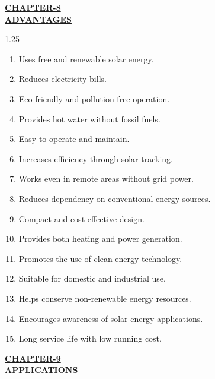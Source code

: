 \documentclass[12pt,a4paper]{article}
\begin{document}

\begin{center}
  {\fontsize{15}{18}\selectfont \bfseries \textcolor{red!80!black}{\underline{CHAPTER-8}}}\\[2mm]
  {\fontsize{16}{20}\selectfont \bfseries \textcolor{red!80!black}{\underline{ADVANTAGES}}}\\[6mm]
\end{center}

\begin{spacing}{1.25}
{\fontsize{10.5}{14.5}\selectfont
\begin{enumerate}[leftmargin=8mm, itemsep=2.2mm]
  \item Uses free and renewable solar energy.
  \item Reduces electricity bills.
  \item Eco-friendly and pollution-free operation.
  \item Provides hot water without fossil fuels.
  \item Easy to operate and maintain.
  \item Increases efficiency through solar tracking.
  \item Works even in remote areas without grid power.
  \item Reduces dependency on conventional energy sources.
  \item Compact and cost-effective design.
  \item Provides both heating and power generation.
  \item Promotes the use of clean energy technology.
  \item Suitable for domestic and industrial use.
  \item Helps conserve non-renewable energy resources.
  \item Encourages awareness of solar energy applications.
  \item Long service life with low running cost.
\end{enumerate}
}
\end{spacing}
\clearpage




\begin{center}
  {\fontsize{15}{18}\selectfont \bfseries \textcolor{red!80!black}{\underline{CHAPTER-9}}}\\[2mm]
  {\fontsize{16}{20}\selectfont \bfseries \textcolor{red!80!black}{\underline{APPLICATIONS}}}\\[6mm]
\end{center}
\end{document}
